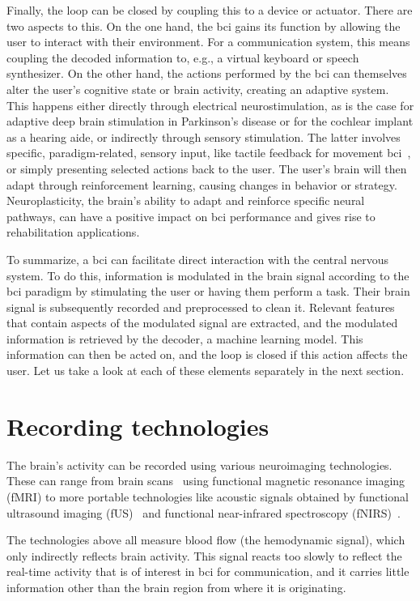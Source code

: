 Finally, the loop can be closed by coupling this to a device or actuator.
There are two aspects to this.
On the one hand, the \ac{bci} gains its function by allowing the user to interact with
their environment.
For a communication system, this means coupling the decoded information to, e.g., a
virtual keyboard or speech synthesizer.
On the other hand, the actions performed by the \ac{bci} can themselves alter the user's
cognitive state or brain activity, creating an adaptive system.
This happens either directly through electrical neurostimulation, as is the
case for adaptive deep brain stimulation in Parkinson's disease or for the
cochlear implant as a hearing aide, or indirectly through sensory stimulation.
The latter involves specific, paradigm-related, sensory input, like tactile feedback for
movement \ac{bci}~\cite{Flesher2021}, or simply presenting selected actions back to the
user.
The user's brain will then adapt through reinforcement learning, causing changes in
behavior or strategy.
Neuroplasticity, the brain's ability to adapt and reinforce specific neural pathways,
can have a positive impact on \ac{bci} performance and gives rise to rehabilitation
applications.

To summarize, a \ac{bci} can facilitate direct interaction with the central nervous
system.
To do this, information is modulated in the brain signal according to the \ac{bci}
paradigm by stimulating the user or having them perform a task.
Their brain signal is subsequently recorded and preprocessed to clean it.
Relevant features that contain aspects of the modulated signal are extracted, and the
modulated information is retrieved by the decoder, a machine learning model.
This information can then be acted on, and the loop is closed if this action affects the
user.
Let us take a look at each of these elements separately in the next section.

\section{Recording technologies}
\label{sec:bci-recording}

The brain's activity can be recorded using various neuroimaging technologies.
These can range from brain scans~\cite{Weiskopf2004} using functional magnetic resonance
imaging (fMRI) to more portable technologies like acoustic signals obtained by
functional ultrasound imaging (fUS)~\cite{Zheng2023} and functional near-infrared spectroscopy
(fNIRS)~\cite{Borgheai2020}.

The technologies above all measure blood flow (the hemodynamic signal), which only
indirectly reflects brain activity.
This signal reacts too slowly to reflect the real-time activity that is of interest in
\ac{bci} for communication, and it carries little information other than the brain
region from where it is originating.

